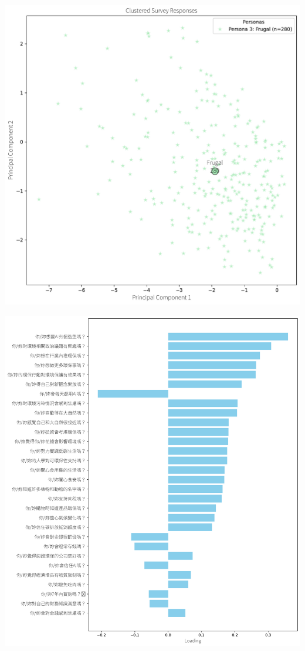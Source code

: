 \documentclass[
  letterpaper,
  DIV=11,
  numbers=noendperiod]{scrartcl}
\begin{document}
\includegraphics{_thesis_files/figure-pdf/cell-81-output-1.pdf}

\includegraphics{_thesis_files/figure-pdf/cell-81-output-2.pdf}
\end{document}
